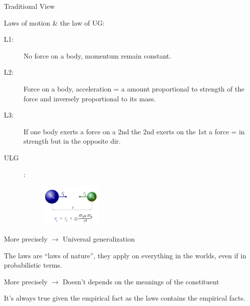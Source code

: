 \documentclass{beamer}
\begin{document}
\begin{frame}{Traditional View}

	Laws of motion \& the law of UG:


	\begin{description}
		\item [L1:] No force on a body, momentum remain constant.
		\item [L2:]
			Force on a body, acceleration = a amount proportional to strength of the force and inversely proportional to its mass.
		\item [L3:]
			If one body exerts a force on a 2nd the 2nd exerts on the 1st a force = in strength but in the opposite dir.
		\item[ULG]:\\ 
			\begin{figure}
				\includegraphics[width=3cm]{200px-NewtonsLawOfUniversalGravitation.png}
			\end{figure}
	\end{description}

\end{frame}
%

\begin{frame}{More precisely}
$\rightarrow$ Universal generalization

\vfill
The laws are ``laws of nature'', they apply on everything in the worlds, even if in probabilistic terms.

\end{frame}
\begin{frame}{More precisely}
$\rightarrow$ Doesn't depends on the meanings of the constituent

\vfill
It's always true given the empirical fact as the laws contains the empirical facts.
\end{frame}
\end{document}
